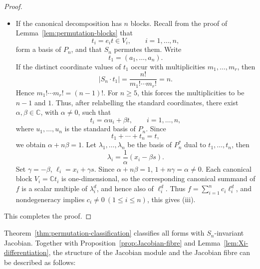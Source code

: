 \documentclass[11pt,reqno]{amsart}
\numberwithin{equation}{section}
\theoremstyle{definition}
\theoremstyle{remark}
\newcommand{\C}{\mathbb C}
\begin{document}
\begin{proof}
\begin{itemize}[leftmargin=0.7cm]
\item If the canonical decomposition has $n$ blocks.
Recall from the proof of Lemma~\ref{lem:permutation-blocks} that
\[
  t_i=e_it\in V_i,\qquad i=1,\ldots,n,
\]
form a basis of $P_n$, and that $S_n$ permutes them.  Write
\[
  t_1=(a_1,\ldots,a_n).
\]
If the
distinct coordinate values of $t_1$ occur with multiplicities
$m_1,\ldots,m_r$, then
\[
  \lvert S_n\cdot t_1\rvert
  =
  \frac{n!}{m_1!\cdots m_r!}
  =
  n.
\]
Hence $m_1!\cdots m_r!=(n-1)!$. For $n\ge5$, this forces the multiplicities to be $n-1$ and $1$. Thus, after relabelling the standard coordinates, there exist
$\alpha,\beta\in\C$, with $\alpha\ne0$, such that
\[
  t_i=\alpha u_i+\beta t,
  \qquad i=1,\ldots,n,
\]
where $u_1,\ldots,u_n$ is the standard basis of $P_n$.  Since
\[
  t_1+\cdots+t_n=t,
\]
we obtain $\alpha+n\beta=1$. Let $\lambda_1,\ldots,\lambda_n$ be the basis of $P_n^*$ dual to
$t_1,\ldots,t_n$,  then
\[
  \lambda_i
  =
  \frac{1}{\alpha}(x_i-\beta s).
\]
Set $\gamma=-\beta$, $\ell_i=x_i+\gamma s$. Since $\alpha+n\beta=1$,  $1+n\gamma=\alpha\neq 0$. Each canonical block $V_i=\C t_i$ is one-dimensional, so the
corresponding canonical summand of $f$ is a scalar multiple of
$\lambda_i^d$, and hence also of $\ell_i^d$.  Thus $f=\sum_{i=1}^n c_i\ell_i^d$,  and nondegeneracy implies $c_i\ne0\ (1\le i\le n)$, this gives \textup{(iii)}.
\end{itemize}
This completes the proof.
\end{proof}


Theorem~\ref{thm:permutation-classification} classifies all forms
with $S_n$-invariant Jacobian.  Together with
Proposition~\ref{prop:Jacobian-fibre} and
Lemma~\ref{lem:Xi-differentiation},  the structure of the
Jacobian module and the Jacobian fibre can be described as follows:
\end{document}

